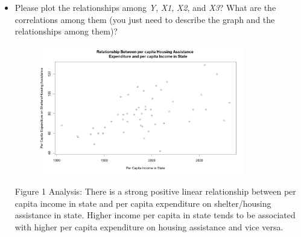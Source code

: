 \documentclass[12pt,letterpaper]{article}
\begin{document}
	\newpage
	\vspace{.5cm}
	\begin{itemize}
		
		\item
		Please plot the relationships among \emph{Y}, \emph{X1}, \emph{X2}, and \emph{X3}? What are the correlations among them (you just need to describe the graph and the relationships among them)?

		
		\begin{figure}[h!]
			\centering
			\caption{\footnotesize}
			\label{fig:plot_1}
			\includegraphics[width=0.85\textwidth]{Figure1.1}  
		\end{figure}
		\noindent
		Figure 1 Analysis: There is a strong positive linear relationship between per capita income in state and per capita expenditure on shelter/housing assistance in state. Higher income per capita in state tends to be associated with higher per capita expenditure on housing assistance and vice versa.
		\newpage
		

\end{itemize}
\end{document}
